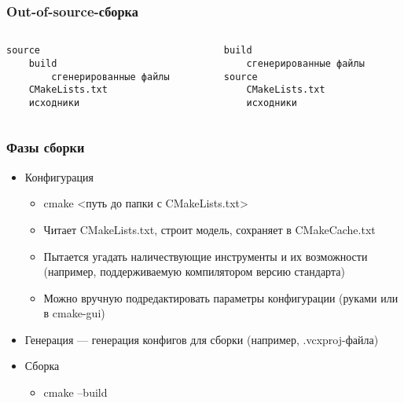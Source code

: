\documentclass{../../slides-style}
\begin{document}
    \begin{frame}[fragile]
        \frametitle{Out-of-source-сборка}
        \begin{columns}
            \begin{column}{0.5\textwidth}
                \begin{verbatim}
source
    build
        сгенерированные файлы
    CMakeLists.txt
    исходники
                \end{verbatim}
            \end{column}
            \begin{column}{0.5\textwidth}
                \begin{verbatim}
build
    сгенерированные файлы
source
    CMakeLists.txt
    исходники
                \end{verbatim}
            \end{column}
        \end{columns}
    \end{frame}

    \begin{frame}
        \frametitle{Фазы сборки}
        \begin{itemize}
            \item Конфигурация
            \begin{itemize}
                \item cmake <путь до папки с CMakeLists.txt>
                \item Читает CMakeLists.txt, строит модель, сохраняет в CMakeCache.txt
                \item Пытается угадать наличествующие инструменты и их возможности (например, поддерживаемую компилятором версию стандарта)
                \item Можно вручную подредактировать параметры конфигурации (руками или в cmake-gui)
            \end{itemize}
            \item Генерация --- генерация конфигов для сборки (например, .vcxproj-файла)
            \item Сборка
            \begin{itemize}
                \item cmake --build
            \end{itemize}
        \end{itemize}
    \end{frame}
\end{document}
